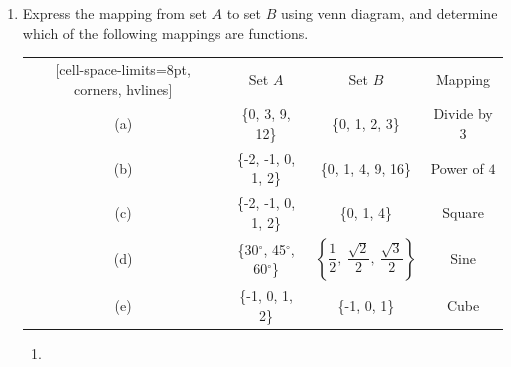\documentclass[12pt]{report}
\begin{document}
\begin{enumerate}
  \item Express the mapping from set $A$ to set $B$ using venn diagram, and determine
        which of the following mappings are functions.

        \begin{center}
          \begin{NiceTabular}{|c|c|c|c|}[cell-space-limits=8pt, corners, hvlines]
            & Set $A$                                & Set $B$                                                                   & Mapping       \\
            (a) & \{0, 3, 9, 12\}                        & \{0, 1, 2, 3\}                                                            & Divide by $3$ \\
            (b) & \{-2, -1, 0, 1, 2\}                    & \{0, 1, 4, 9, 16\}                                                        & Power of $4$  \\
            (c) & \{-2, -1, 0, 1, 2\}                    & \{0, 1, 4\}                                                               & Square        \\
            (d) & \{30$^\circ$, 45$^\circ$, 60$^\circ$\} & $\left\{\dfrac{1}{2},\ \dfrac{\sqrt{2}}{2},\ \dfrac{\sqrt{3}}{2}\right\}$ & Sine          \\
            (e) & \{-1, 0, 1, 2\}                        & \{-1, 0, 1\}                                                              & Cube          \\
          \end{NiceTabular}
        \end{center}

        \sol{}

        \setlength{\columnseprule}{1pt}
        \setlength{\columnsep}{24pt}

        \begin{multicols}{2}

          \begin{enumerate}[label=(\alph*)]
            \item {}
\end{enumerate}
\end{multicols}
\end{enumerate}
\end{document}
